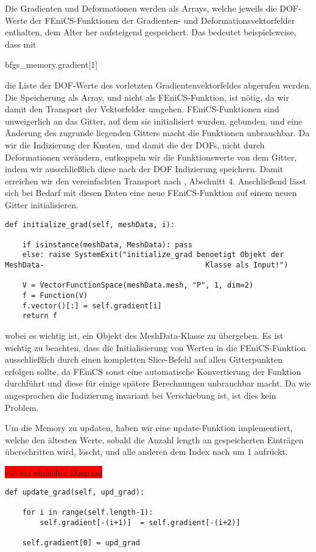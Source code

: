 Die Gradienten und Deformationen werden als Arrays, welche jeweils die DOF-Werte der FEniCS-Funktionen der Gradienten- und Deformationsvektorfelder enthalten, dem Alter her aufsteigend gespeichert. Das bedeutet beispielsweise, dass mit 
\begin{center}
	\textsf{bfgs\_memory.gradient[1]}
\end{center} 
die Liste der DOF-Werte des vorletzten Gradientenvektorfeldes abgerufen werden. Die Speicherung als Array, und nicht als FEniCS-Funktion, ist nötig, da wir damit den Transport der Vektorfelder umgehen. FEniCS-Funktionen sind unweigerlich an das Gitter, auf dem sie initialisiert wurden, gebunden, und eine Änderung des zugrunde liegenden Gitters macht die Funktionen unbrauchbar. Da wir die Indizierung der Knoten, und damit die der DOFs, nicht durch Deformationen verändern, entkoppeln wir die Funktionswerte von dem Gitter, indem wir ausschließlich diese nach der DOF Indizierung speichern. Damit erreichen wir den vereinfachten Transport nach \cite{diffusion}, Abschnitt 4. 
Anschließend  lässt sich bei Bedarf mit diesen Daten eine neue FEniCS-Funktion auf einem neuen Gitter initialisieren.
\begin{lstlisting}
def initialize_grad(self, meshData, i):

    if isinstance(meshData, MeshData): pass
    else: raise SystemExit("initialize_grad benoetigt Objekt der MeshData-			 						   Klasse als Input!")

    V = VectorFunctionSpace(meshData.mesh, "P", 1, dim=2)
    f = Function(V)
    f.vector()[:] = self.gradient[i]
    return f
\end{lstlisting}
wobei es wichtig ist, ein Objekt des \textsf{MeshData}-Klasse zu übergeben. Es ist wichtig zu beachten, dass die Initialisierung von Werten in die FEniCS-Funktion ausschließlich durch einen kompletten Slice-Befehl auf allen Gitterpunkten erfolgen sollte, da FEniCS sonst eine automatische Konvertierung der Funktion durchführt und diese für einige spätere Berechnungen unbrauchbar macht. Da wie angesprochen die Indizierung invariant bei Verschiebung ist, ist dies kein Problem.

Um die Memory zu updaten, haben wir eine update-Funktion implementiert, welche 
den ältesten Werte, sobald die Anzahl \textsf{length} an gespeicherten Einträgen überschritten wird, löscht, und alle anderen dem Index nach um 1 aufrückt. 

\colorbox{red}{ vllt ein einfaches Diagram}

\begin{lstlisting}
def update_grad(self, upd_grad):
    
    for i in range(self.length-1): 
      	self.gradient[-(i+1)]  = self.gradient[-(i+2)]
    
    self.gradient[0] = upd_grad
\end{lstlisting}

